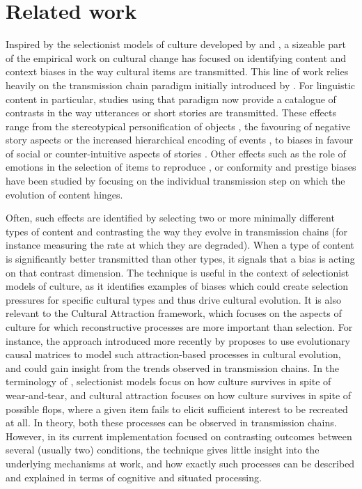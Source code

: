 \section{Related work}\label{sec:gistr-related}

Inspired by the selectionist models of culture developed by
\textcite{boyd_culture_1985} and
\textcite{cavalli-sforza_cultural_1981}, a sizeable part of the
empirical work on cultural change has focused on identifying content and
context biases in the way cultural items are transmitted. This line of
work relies heavily on the transmission chain paradigm initially
introduced by \textcite{bartlett_remembering:_1995}. For linguistic
content in particular, studies using that paradigm now provide a
catalogue of contrasts in the way utterances or short stories are
transmitted. These effects range from the stereotypical personification
of objects \autocite{bangerter_transformation_2000}, the favouring of
negative story aspects \autocite{bebbington_sky_2017} or the increased
hierarchical encoding of events \autocite{mesoudi_hierarchical_2004}, to
biases in favour of social \autocite{mesoudi_bias_2006} or
counter-intuitive aspects of stories
\autocites{norenzayan_memory_2006}{barrett_spreading_2001}. Other
effects such as the role of emotions in the selection of items to
reproduce \autocites{heath_emotional_2001}{eriksson_corpses_2014}, or
conformity and prestige biases \autocite{acerbi_did_2017} have been
studied by focusing on the individual transmission step on which the
evolution of content hinges.

Often, such effects are identified by selecting two or more minimally
different types of content and contrasting the way they evolve in
transmission chains (for instance measuring the rate at which they are
degraded). When a type of content is significantly better transmitted
than other types, it signals that a bias is acting on that contrast
dimension. The technique is useful in the context of selectionist models
of culture, as it identifies examples of biases which could create
selection pressures for specific cultural types and thus drive cultural
evolution. It is also relevant to the Cultural Attraction framework,
which focuses on the aspects of culture for which reconstructive
processes are more important than selection. For instance, the approach
introduced more recently by \textcite{claidiere_how_2014} proposes to
use evolutionary causal matrices to model such attraction-based
processes in cultural evolution, and could gain insight from the trends
observed in transmission chains. In the terminology of
\textcite{morin_how_2016}, selectionist models focus on how culture
survives in spite of wear-and-tear, and cultural attraction focuses on
how culture survives in spite of possible flops, where a given item
fails to elicit sufficient interest to be recreated at all. In theory,
both these processes can be observed in transmission chains. However, in
its current implementation focused on contrasting outcomes between
several (usually two) conditions, the technique gives little insight
into the underlying mechanisms at work, and how exactly such processes
can be described and explained in terms of cognitive and situated
processing.

